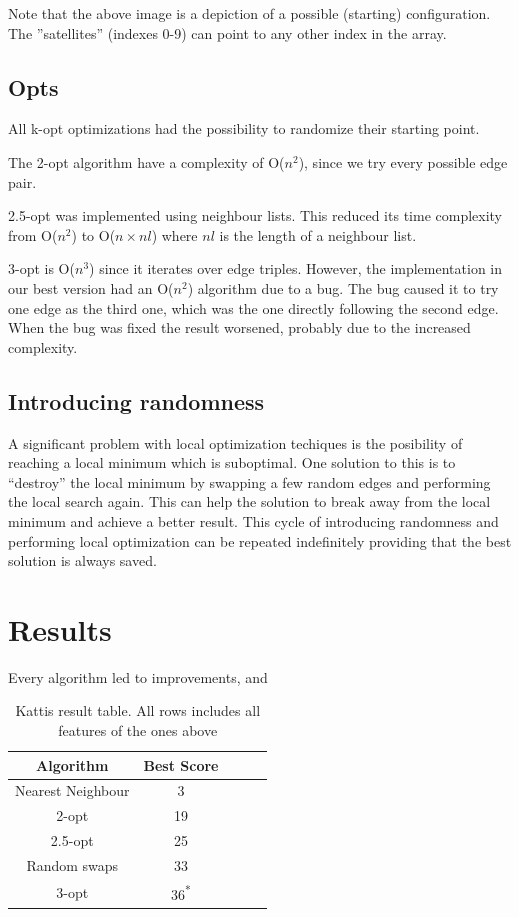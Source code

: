 \documentclass[paper=a4, fontsize=11pt,numbers=endperiod]{scrartcl} %
\numberwithin{equation}{section} %
\numberwithin{figure}{section} %
\numberwithin{table}{section} %
\begin{document}
Note that the above image is a depiction of a possible (starting) configuration. The ''satellites'' (indexes 0-9) can point to any other index in the array.

\subsection{Opts}
All k-opt optimizations had the possibility to randomize their starting point.

The 2-opt algorithm have a complexity of O($n^2$), since we try every possible edge pair.

2.5-opt was implemented using neighbour lists.
This reduced its time complexity from O($n^2$) to O($n\times nl$) where $nl$ is the length of a neighbour list.

3-opt is O($n^3$) since it iterates over edge triples.
However, the implementation in our best version had an O($n^2$) algorithm due to a bug.
The bug caused it to try one edge as the third one, which was the one directly following the second edge.
When the bug was fixed the result worsened, probably due to the increased complexity.

\subsection{Introducing randomness}
A significant problem with local optimization techiques is the posibility of reaching a local minimum which is suboptimal.
One solution to this is to ``destroy'' the local minimum by swapping a few random edges and performing the local search again.
This can help the solution to break away from the local minimum and achieve a better result.
This cycle of introducing randomness and performing local optimization can be repeated indefinitely providing that the best solution is always saved.


\section{Results}

Every algorithm led to improvements, and 

\begin{table}[h]
  \centering
    \begin{tabular}{|c|c|c|c|c|}
    \hline
    \textbf{Algorithm} & \textbf{Best Score} \\ \hline
    Nearest Neighbour & 3 \\ \hline
    2-opt & 19 \\ \hline
    2.5-opt & 25 \\ \hline
    Random swaps & 33 \\ \hline
    3-opt & 36\textsuperscript{*} \\ \hline
    \end{tabular}
    \caption{Kattis result table. All rows includes all features of the ones above}
    \hspace{10pt}
  \end{table}
\end{document}
